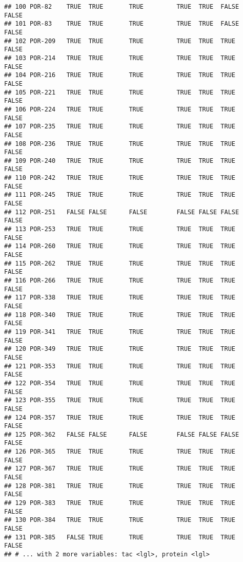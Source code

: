 \documentclass[]{article}
\begin{document}
\begin{verbatim}
## 100 POR-82    TRUE  TRUE       TRUE         TRUE  TRUE  FALSE   FALSE     
## 101 POR-83    TRUE  TRUE       TRUE         TRUE  TRUE  FALSE   FALSE     
## 102 POR-209   TRUE  TRUE       TRUE         TRUE  TRUE  TRUE    FALSE     
## 103 POR-214   TRUE  TRUE       TRUE         TRUE  TRUE  TRUE    FALSE     
## 104 POR-216   TRUE  TRUE       TRUE         TRUE  TRUE  TRUE    FALSE     
## 105 POR-221   TRUE  TRUE       TRUE         TRUE  TRUE  TRUE    FALSE     
## 106 POR-224   TRUE  TRUE       TRUE         TRUE  TRUE  TRUE    FALSE     
## 107 POR-235   TRUE  TRUE       TRUE         TRUE  TRUE  TRUE    FALSE     
## 108 POR-236   TRUE  TRUE       TRUE         TRUE  TRUE  TRUE    FALSE     
## 109 POR-240   TRUE  TRUE       TRUE         TRUE  TRUE  TRUE    FALSE     
## 110 POR-242   TRUE  TRUE       TRUE         TRUE  TRUE  TRUE    FALSE     
## 111 POR-245   TRUE  TRUE       TRUE         TRUE  TRUE  TRUE    FALSE     
## 112 POR-251   FALSE FALSE      FALSE        FALSE FALSE FALSE   FALSE     
## 113 POR-253   TRUE  TRUE       TRUE         TRUE  TRUE  TRUE    FALSE     
## 114 POR-260   TRUE  TRUE       TRUE         TRUE  TRUE  TRUE    FALSE     
## 115 POR-262   TRUE  TRUE       TRUE         TRUE  TRUE  TRUE    FALSE     
## 116 POR-266   TRUE  TRUE       TRUE         TRUE  TRUE  TRUE    FALSE     
## 117 POR-338   TRUE  TRUE       TRUE         TRUE  TRUE  TRUE    FALSE     
## 118 POR-340   TRUE  TRUE       TRUE         TRUE  TRUE  TRUE    FALSE     
## 119 POR-341   TRUE  TRUE       TRUE         TRUE  TRUE  TRUE    FALSE     
## 120 POR-349   TRUE  TRUE       TRUE         TRUE  TRUE  TRUE    FALSE     
## 121 POR-353   TRUE  TRUE       TRUE         TRUE  TRUE  TRUE    FALSE     
## 122 POR-354   TRUE  TRUE       TRUE         TRUE  TRUE  TRUE    FALSE     
## 123 POR-355   TRUE  TRUE       TRUE         TRUE  TRUE  TRUE    FALSE     
## 124 POR-357   TRUE  TRUE       TRUE         TRUE  TRUE  TRUE    FALSE     
## 125 POR-362   FALSE FALSE      FALSE        FALSE FALSE FALSE   FALSE     
## 126 POR-365   TRUE  TRUE       TRUE         TRUE  TRUE  TRUE    FALSE     
## 127 POR-367   TRUE  TRUE       TRUE         TRUE  TRUE  TRUE    FALSE     
## 128 POR-381   TRUE  TRUE       TRUE         TRUE  TRUE  TRUE    FALSE     
## 129 POR-383   TRUE  TRUE       TRUE         TRUE  TRUE  TRUE    FALSE     
## 130 POR-384   TRUE  TRUE       TRUE         TRUE  TRUE  TRUE    FALSE     
## 131 POR-385   FALSE TRUE       TRUE         TRUE  TRUE  TRUE    FALSE     
## # ... with 2 more variables: tac <lgl>, protein <lgl>
\end{verbatim}
\end{document}
